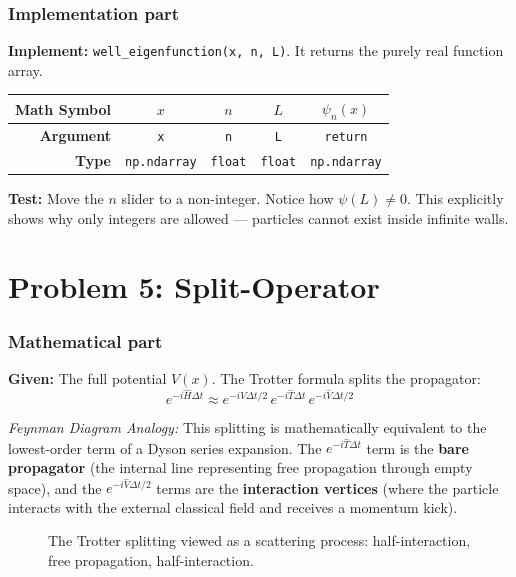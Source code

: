 \documentclass[11pt]{article}
\begin{document}
\subsubsection*{Implementation part}
\textbf{Implement:} \lstinline|well_eigenfunction(x, n, L)|. It returns the purely real function array.
\begin{center}
\renewcommand{\arraystretch}{2.0}
\begin{tabular}{r | c | c | c | c}
\toprule
\textbf{Math Symbol} & $x$ & $n$ & $L$ & $\psi_n(x)$ \\
\midrule
\textbf{Argument} & \lstinline|x| & \lstinline|n| & \lstinline|L| & \lstinline|return| \\
\midrule
\textbf{Type} & \lstinline|np.ndarray| & \lstinline|float| & \lstinline|float| & \lstinline|np.ndarray| \\
\bottomrule
\end{tabular}
\end{center}
\textbf{Test:} Move the $n$ slider to a non-integer. Notice how $\psi(L) \neq 0$. This explicitly shows why only integers are allowed — particles cannot exist inside infinite walls.


\section*{Problem 5: Split-Operator}

\subsubsection*{Mathematical part}
\textbf{Given:} The full potential $V(x)$. The Trotter formula splits the propagator:
$$ e^{-i \hat{H} \Delta t } \approx e^{-i \hat{V} \Delta t/2 } \, e^{-i \hat{T} \Delta t } \, e^{-i \hat{V} \Delta t/2 } $$

\textit{Feynman Diagram Analogy:} This splitting is mathematically equivalent to the lowest-order term of a Dyson series expansion. The $e^{-i \hat{T} \Delta t}$ term is the \textbf{bare propagator} (the internal line representing free propagation through empty space), and the $e^{-i \hat{V} \Delta t / 2}$ terms are the \textbf{interaction vertices} (where the particle interacts with the external classical field and receives a momentum kick).

\begin{figure}[h]
\centering
{}
\caption{The Trotter splitting viewed as a scattering process: half-interaction, free propagation, half-interaction.}
\end{figure}
\end{document}
